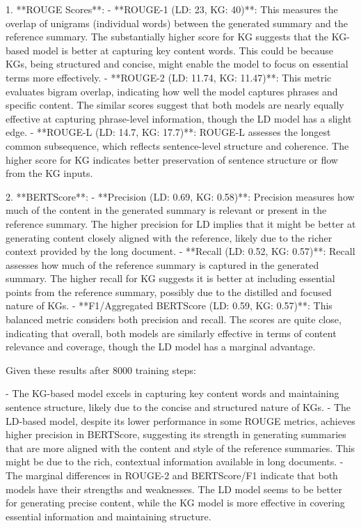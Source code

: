 \documentclass[12pt]{article}
\begin{document}
1. **ROUGE Scores**:
  - **ROUGE-1 (LD: 23, KG: 40)**: This measures the overlap of unigrams (individual words) between the generated summary and the reference summary. The substantially higher score for KG suggests that the KG-based model is better at capturing key content words. This could be because KGs, being structured and concise, might enable the model to focus on essential terms more effectively.
  - **ROUGE-2 (LD: 11.74, KG: 11.47)**: This metric evaluates bigram overlap, indicating how well the model captures phrases and specific content. The similar scores suggest that both models are nearly equally effective at capturing phrase-level information, though the LD model has a slight edge.
  - **ROUGE-L (LD: 14.7, KG: 17.7)**: ROUGE-L assesses the longest common subsequence, which reflects sentence-level structure and coherence. The higher score for KG indicates better preservation of sentence structure or flow from the KG inputs.


2. **BERTScore**:
  - **Precision (LD: 0.69, KG: 0.58)**: Precision measures how much of the content in the generated summary is relevant or present in the reference summary. The higher precision for LD implies that it might be better at generating content closely aligned with the reference, likely due to the richer context provided by the long document.
  - **Recall (LD: 0.52, KG: 0.57)**: Recall assesses how much of the reference summary is captured in the generated summary. The higher recall for KG suggests it is better at including essential points from the reference summary, possibly due to the distilled and focused nature of KGs.
  - **F1/Aggregated BERTScore (LD: 0.59, KG: 0.57)**: This balanced metric considers both precision and recall. The scores are quite close, indicating that overall, both models are similarly effective in terms of content relevance and coverage, though the LD model has a marginal advantage.


Given these results after 8000 training steps:


- The KG-based model excels in capturing key content words and maintaining sentence structure, likely due to the concise and structured nature of KGs.
- The LD-based model, despite its lower performance in some ROUGE metrics, achieves higher precision in BERTScore, suggesting its strength in generating summaries that are more aligned with the content and style of the reference summaries. This might be due to the rich, contextual information available in long documents.
- The marginal differences in ROUGE-2 and BERTScore/F1 indicate that both models have their strengths and weaknesses. The LD model seems to be better for generating precise content, while the KG model is more effective in covering essential information and maintaining structure.
\end{document}
